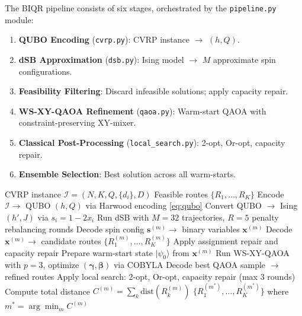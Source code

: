 \documentclass[11pt,a4paper]{article}
\theoremstyle{definition}
\begin{document}
The BIQR pipeline consists of six stages, orchestrated by the \texttt{pipeline.py} module:

\begin{enumerate}
    \item \textbf{QUBO Encoding} (\texttt{cvrp.py}): CVRP instance $\to$ $(h, Q)$.
    \item \textbf{dSB Approximation} (\texttt{dsb.py}): Ising model $\to$ $M$ approximate spin configurations.
    \item \textbf{Feasibility Filtering}: Discard infeasible solutions; apply capacity repair.
    \item \textbf{WS-XY-QAOA Refinement} (\texttt{qaoa.py}): Warm-start QAOA with constraint-preserving XY-mixer.
    \item \textbf{Classical Post-Processing} (\texttt{local\_search.py}): 2-opt, Or-opt, capacity repair.
    \item \textbf{Ensemble Selection}: Best solution across all warm-starts.
\end{enumerate}

\begin{algorithm}[htbp]
\caption{BIQR Pipeline}\label{alg:biqr}
\begin{algorithmic}[1]
\Require CVRP instance $\mathcal{I} = (N, K, Q, \{d_i\}, D)$
\Ensure Feasible routes $\{R_1, \dots, R_K\}$
\State Encode $\mathcal{I} \to$ QUBO $(h, Q)$ via Harwood encoding \eqref{eq:qubo}
\State Convert QUBO $\to$ Ising $(h', J)$ via $s_i = 1 - 2x_i$
\State Run dSB with $M=32$ trajectories, $R=5$ penalty rebalancing rounds
    \State Decode spin config $\mathbf{s}^{(m)} \to$ binary variables $\mathbf{x}^{(m)}$
    \State Decode $\mathbf{x}^{(m)} \to$ candidate routes $\{R_1^{(m)}, \dots, R_K^{(m)}\}$
        \State Apply assignment repair and capacity repair
    \EndIf
        \State Prepare warm-start state $|\psi_0\rangle$ from $\mathbf{x}^{(m)}$
        \State Run WS-XY-QAOA with $p=3$, optimize $(\boldsymbol{\gamma}, \boldsymbol{\beta})$ via COBYLA
        \State Decode best QAOA sample $\to$ refined routes
    \EndIf
    \State Apply local search: 2-opt, Or-opt, capacity repair (max 3 rounds)
    \State Compute total distance $C^{(m)} = \sum_k \text{dist}(R_k^{(m)})$
\EndFor
\State \Return $\{R_1^{(m^*)}, \dots, R_K^{(m^*)}\}$ where $m^* = \arg\min_m C^{(m)}$
\end{algorithmic}
\end{algorithm}
\end{document}

